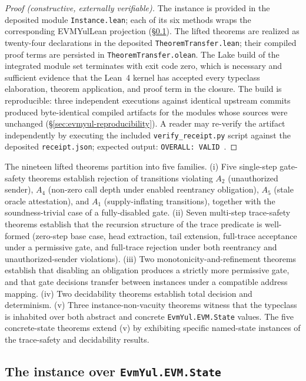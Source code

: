 \documentclass[11pt,a4paper]{article}
\begin{document}
\begin{proof}[Proof (constructive, externally verifiable)]
The instance is provided in the deposited module \texttt{Instance.lean}; each of its six methods wraps the corresponding EVMYulLean projection (\S\ref{sec:evmyul-instance}). The lifted theorems are realized as twenty-four declarations in the deposited \texttt{TheoremTransfer.lean}; their compiled proof terms are persisted in \texttt{TheoremTransfer.olean}. The Lake build of the integrated module set terminates with exit code zero, which is necessary and sufficient evidence that the Lean~4 kernel has accepted every typeclass elaboration, theorem application, and proof term in the closure. The build is reproducible: three independent executions against identical upstream commits produced byte-identical compiled artifacts for the modules whose sources were unchanged (\S\ref{sec:evmyul-reproducibility}). A reader may re-verify the artifact independently by executing the included \texttt{verify\_receipt.py} script against the deposited \texttt{receipt.json}; expected output: \texttt{OVERALL:\ VALID}~\cite{duncan2026parallax5verification}.
\end{proof}

The nineteen lifted theorems partition into five families. (i) Five single-step gate-safety theorems establish rejection of transitions violating $A_2$ (unauthorized sender), $A_4$ (non-zero call depth under enabled reentrancy obligation), $A_5$ (stale oracle attestation), and $A_1$ (supply-inflating transitions), together with the soundness-trivial case of a fully-disabled gate. (ii) Seven multi-step trace-safety theorems establish that the recursion structure of the trace predicate is well-formed (zero-step base case, head extraction, tail extension, full-trace acceptance under a permissive gate, and full-trace rejection under both reentrancy and unauthorized-sender violations). (iii) Two monotonicity-and-refinement theorems establish that disabling an obligation produces a strictly more permissive gate, and that gate decisions transfer between instances under a compatible address mapping. (iv) Two decidability theorems establish total decision and determinism. (v) Three instance-non-vacuity theorems witness that the typeclass is inhabited over both abstract and concrete \texttt{EvmYul.EVM.State} values. The five concrete-state theorems extend (v) by exhibiting specific named-state instances of the trace-safety and decidability results.

\subsection{The instance over \texttt{EvmYul.EVM.State}}\label{sec:evmyul-instance}
\end{document}
